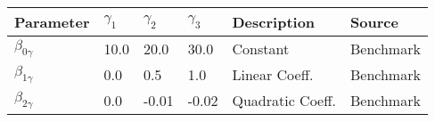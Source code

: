 \begin{tabular}{l l l l l l} 
\hline 
 Parameter & $\gamma_1$ &  $\gamma_2$ & $\gamma_3$ & Description & Source \\ 
\hline 
$\beta_{0\gamma}$ & 10.0 &  20.0 & 30.0 & Constant & Benchmark \\ 
$\beta_{1\gamma}$ & 0.0 &  0.5 & 1.0 & Linear Coeff. & Benchmark \\ 
$\beta_{2\gamma}$ & 0.0 &  -0.01 & -0.02 & Quadratic Coeff. & Benchmark \\ 
\hline 
\end{tabular}